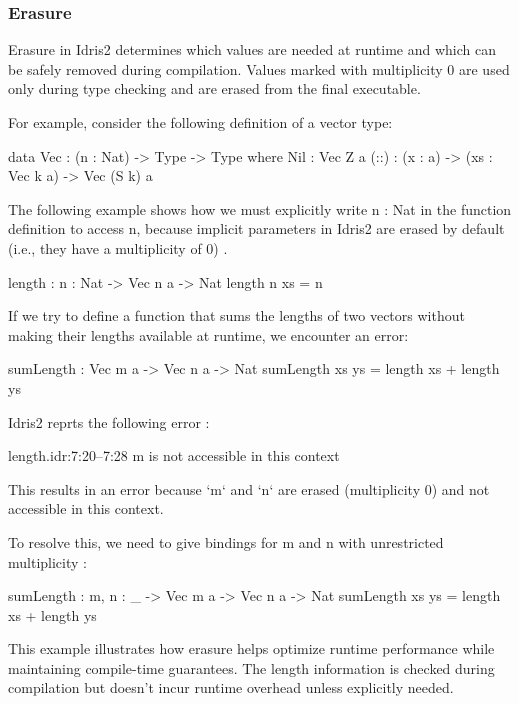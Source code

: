 \documentclass[]{rptuseminar}
\begin{document}
\subsubsection{Erasure}
Erasure in Idris2 determines which values are needed at runtime and which can be safely removed during compilation. Values marked with multiplicity 0 are used only during type checking and are erased from the final executable.

For example, consider the following definition of a vector type:

\begin{idris}
data Vec : (n : Nat) -> Type -> Type where
    Nil : Vec Z a
    (::) : (x : a) -> (xs : Vec k a) -> Vec (S k) a
\end{idris}

The following example shows how we must explicitly write { n : Nat } in the function definition to access n, because implicit parameters in Idris2 are erased by default (i.e., they have a multiplicity of 0) \cite{brady2021idris}.
\begin{idris}
length : { n : Nat} -> Vec n a -> Nat
length {n} xs = n
\end{idris}



If we try to define a function that sums the lengths of two vectors without making their lengths available at runtime, we encounter an error:

\begin{idris}
sumLength : Vec m a -> Vec n a -> Nat
sumLength xs ys = length xs + length ys
\end{idris}

Idris2 reprts the following error :
\begin{idris}
length.idr:7:20--7:28
m is not accessible in this context
\end{idris}
This results in an error because `m` and `n` are erased (multiplicity 0) and not accessible in this context.

To resolve this, we need to give bindings for m and n with unrestricted multiplicity :

\begin{idris}
sumLength : {m, n : _} -> Vec m a -> Vec n a -> Nat
sumLength xs ys = length xs + length ys
\end{idris}

This example illustrates how erasure helps optimize runtime performance while maintaining compile-time guarantees. The length information is checked during compilation but doesn't incur runtime overhead unless explicitly needed.
\end{document}
